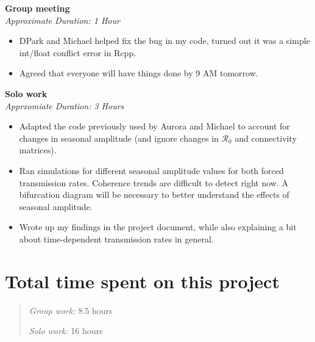 \documentclass[12pt]{article}\usepackage[]{graphicx}\usepackage[]{color}
\begin{document}
\textbf{Group meeting} \\
\emph{Approximate Duration: 1 Hour}
\begin{itemize}
\item DPark and Michael helped fix the bug in my code, turned out it was a simple int/float conflict error in Rcpp.
\item Agreed that everyone will have things done by 9 AM tomorrow.
\end{itemize}

\textbf{Solo work} \\
\emph{Apprxomiate Duration: 3 Hours}
\begin{itemize}
\item Adapted the code previously used by Aurora and Michael to account for changes in seasonal amplitude (and ignore changes in $\mathcal{R}_0$ and connectivity matrices).
\item Ran simulations for different seasonal amplitude values for both forced transmission rates. Coherence trends are difficult to detect right now. A bifurcation diagram will be necessary to better understand the effects of seasonal amplitude.
\item Wrote up my findings in the project document, while also explaining a bit about time-dependent transmission rates in general.
\end{itemize}

\section*{Total time spent on this project}

\begin{quote}

\emph{Group work:} 8.5 hours

\emph{Solo work:} 16 hours

\end{quote}
\end{document}
